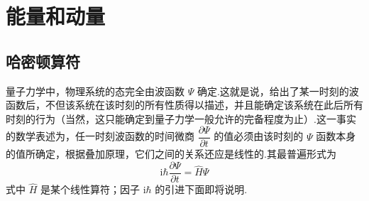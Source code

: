 %
\chapter{能量和动量}

\section{哈密顿算符}

量子力学中，物理系统的态完全由波函数 $\varPsi$ 确定.这就是说，给出了某一时刻的波函数后，不但该系统在该时刻的所有性质得以描述，并且能确定该系统在此后所有时刻的行为（当然，这只能确定到量子力学一般允许的完备程度为止）.这一事实的数学表述为，任一时刻波函数的时间微商 $\dfrac{\partial\varPsi}{\partial t}$ 的值必须由该时刻的 $\varPsi$ 函数本身的值所确定，根据叠加原理，它们之间的关系还应是线性的.其最普遍形式为
\begin{equation}
  \mathrm{i}\hbar\frac{\partial\varPsi}{\partial t}=\hat{H}\varPsi
\end{equation}
式中 $\hat{H}$ 是某个线性算符；因子 $\mathrm{i}\hbar$ 的引进下面即将说明.

